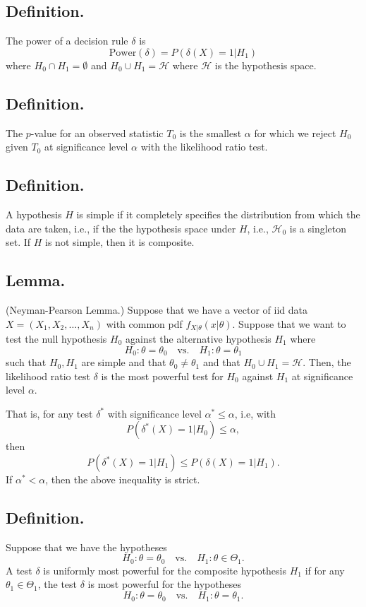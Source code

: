 \documentclass[titlepage]{article}
\begin{document}
\subsection{Definition.} The power of a decision rule $\delta$ is 
$$\text{Power}(\delta) = P(\delta(X)=1|H_{1})$$
where $H_{0} \cap H_{1} = \emptyset$ and $H_{0} \cup H_{1} = \mathcal{H}$ where $\mathcal{H}$ is the hypothesis space.

\subsection{Definition.} The $p$-value for an observed statistic $T_{0}$ is the smallest $\alpha$ for which we reject $H_{0}$ given $T_{0}$ at significance level $\alpha$ with the likelihood ratio test.

\subsection{Definition.} A hypothesis $H$ is simple if it completely specifies the distribution from which the data are taken, i.e., if the the hypothesis space under $H$, i.e., $\mathcal{H}_{0}$ is a singleton set. If $H$ is not simple, then it is composite.

\subsection{Lemma.} (Neyman-Pearson Lemma.) Suppose that we have a vector of iid data $X = (X_{1}, X_{2}, \ldots, X_{n})$ with common pdf $f_{X|\theta}(x|\theta)$. Suppose that we want to test the null hypothesis $H_{0}$ against the alternative hypothesis $H_{1}$ where 
$$H_{0}: \theta = \theta_{0} \quad \text{vs.} \quad H_{1}: \theta = \theta_{1}$$
such that $H_{0}, H_{1}$ are simple and that $\theta_{0} \neq \theta_{1}$ and that $H_{0} \cup H_{1} = \mathcal{H}$. Then, the likelihood ratio test $\delta$ is the most powerful test for $H_{0}$ against $H_{1}$ at significance level $\alpha$. 

That is, for any test $\delta^{*}$ with significance level $\alpha^{*} \leq \alpha$, i.e, with 
$$P(\delta^{*}(X)=1|H_{0}) \leq \alpha,$$
then 
$$P(\delta^{*}(X)=1|H_{1}) \leq P(\delta(X)=1|H_{1}).$$
If $\alpha^{*} < \alpha$, then the above inequality is strict.

\subsection{Definition.} Suppose that we have the hypotheses 
$$H_{0}: \theta = \theta_{0} \quad \text{vs.} \quad H_{1}: \theta \in \Theta_{1}.$$
A test $\delta$ is uniformly most powerful for the composite hypothesis $H_{1}$ if for any $\theta_{1} \in \Theta_{1}$, the test $\delta$ is most powerful for the hypotheses  
$$H_{0}: \theta = \theta_{0} \quad \text{vs.} \quad H_{1}: \theta = \theta_{1}.$$
\end{document}
